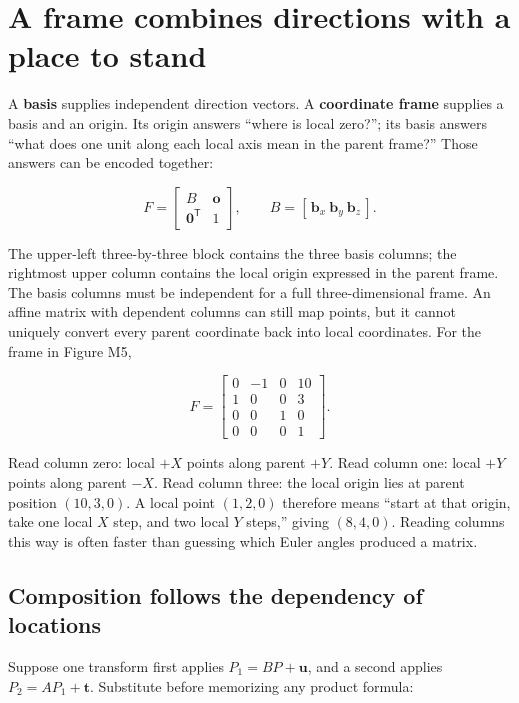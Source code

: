 \section{A frame combines directions with a place to stand}\label{01-foundations-i-ch018-a-frame-combines-directions-with-a-place-to-stand}

A \textbf{basis} supplies independent direction vectors. A \textbf{coordinate frame} supplies a basis and an origin. Its origin answers ``where is local zero?''; its basis answers ``what does one unit along each local axis mean in the parent frame?'' Those answers can be encoded together:

\[
F=\begin{bmatrix}B&\mathbf o\\\mathbf0^{\mathsf T}&1\end{bmatrix},
\qquad B=[\,\mathbf b_x\ \mathbf b_y\ \mathbf b_z\,].
\]

The upper-left three-by-three block contains the three basis columns; the rightmost upper column contains the local origin expressed in the parent frame. The basis columns must be independent for a full three-dimensional frame. An affine matrix with dependent columns can still map points, but it cannot uniquely convert every parent coordinate back into local coordinates. For the frame in Figure M5,

\[
F=
\begin{bmatrix}
0&-1&0&10\\
1&0&0&3\\
0&0&1&0\\
0&0&0&1
\end{bmatrix}.
\]

Read column zero: local \(+X\) points along parent \(+Y\). Read column one: local \(+Y\) points along parent \(-X\). Read column three: the local origin lies at parent position \((10,3,0)\). A local point \((1,2,0)\) therefore means ``start at that origin, take one local \(X\) step, and two local \(Y\) steps,'' giving \((8,4,0)\). Reading columns this way is often faster than guessing which Euler angles produced a matrix.

\subsection{Composition follows the dependency of locations}\label{01-foundations-i-ch018-composition-follows-the-dependency-of-locations}

Suppose one transform first applies \(P_1=BP+\mathbf u\), and a second applies \(P_2=AP_1+\mathbf t\). Substitute before memorizing any product formula:

